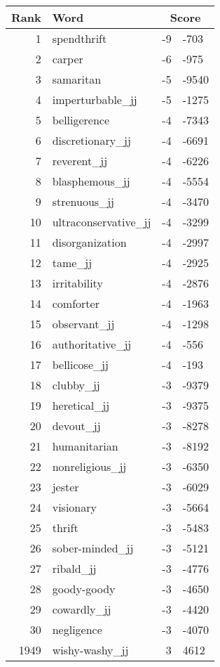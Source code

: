 \begin{longtable}[!htbp]{| rlr@{.}l |}
    \hline
    \textbf{Rank} & \textbf{Word} & \multicolumn{2}{c|}{\textbf{Score}} \\
    \hline
    \endhead
    1 & spendthrift & -9 & -703 \\
    2 & carper & -6 & -975 \\
    3 & samaritan & -5 & -9540 \\
    4 & imperturbable\_jj & -5 & -1275 \\
    5 & belligerence & -4 & -7343 \\
    6 & discretionary\_jj & -4 & -6691 \\
    7 & reverent\_jj & -4 & -6226 \\
    8 & blasphemous\_jj & -4 & -5554 \\
    9 & strenuous\_jj & -4 & -3470 \\
    10 & ultraconservative\_jj & -4 & -3299 \\
    11 & disorganization & -4 & -2997 \\
    12 & tame\_jj & -4 & -2925 \\
    13 & irritability & -4 & -2876 \\
    14 & comforter & -4 & -1963 \\
    15 & observant\_jj & -4 & -1298 \\
    16 & authoritative\_jj & -4 & -556 \\
    17 & bellicose\_jj & -4 & -193 \\
    18 & clubby\_jj & -3 & -9379 \\
    19 & heretical\_jj & -3 & -9375 \\
    20 & devout\_jj & -3 & -8278 \\
    21 & humanitarian & -3 & -8192 \\
    22 & nonreligious\_jj & -3 & -6350 \\
    23 & jester & -3 & -6029 \\
    24 & visionary & -3 & -5664 \\
    25 & thrift & -3 & -5483 \\
    26 & sober-minded\_jj & -3 & -5121 \\
    27 & ribald\_jj & -3 & -4776 \\
    28 & goody-goody & -3 & -4650 \\
    29 & cowardly\_jj & -3 & -4420 \\
    30 & negligence & -3 & -4070 \\
    1949 & wishy-washy\_jj & 3 & 4612 \\

\end{longtable}
